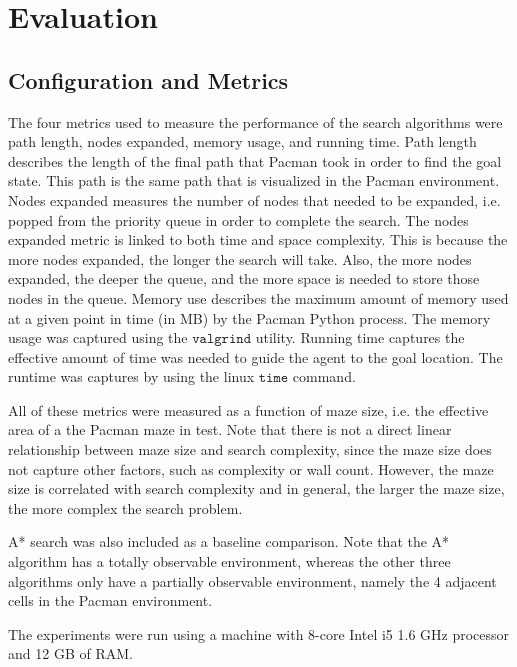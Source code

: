

\section{Evaluation}\label{sec:eval}
	\subsection{Configuration and Metrics}
    The four metrics used to measure the performance of the search algorithms were path length, nodes expanded, memory usage, and running time. Path length describes the length of the final path that Pacman took in order to find the goal state. This path is the same path that is visualized in the Pacman environment. Nodes expanded measures the number of nodes that needed to be expanded, i.e. popped from the priority queue in order to complete the search. The nodes expanded metric is linked to both time and space complexity. This is because the more nodes expanded, the longer the search will take. Also, the more nodes expanded, the deeper the queue, and the more space is needed to store those nodes in the queue. Memory use describes the maximum amount of memory used at a given point in time (in MB) by the Pacman Python process. The memory usage was  captured using the $\texttt{valgrind}$ utility. Running time captures the effective amount of time was needed to guide the agent to the goal location. The runtime was captures by using the linux $\texttt{time}$ command. 
    
    All of these metrics were measured as a function of maze size, i.e. the effective area of a the Pacman maze in test. Note that there is not a direct linear relationship between maze size and search complexity, since the maze size does not capture other factors, such as complexity or wall count. However, the maze size is correlated with search complexity and in general, the larger the maze size, the more complex the search problem.
    
    A* search was also included as a baseline comparison. Note that the A* algorithm has a totally observable environment, whereas the other three algorithms only have a partially observable environment, namely the 4 adjacent cells in the Pacman environment.
    
    The experiments were run using a machine with 8-core Intel i5 1.6 GHz processor and 12 GB of RAM. 
    
